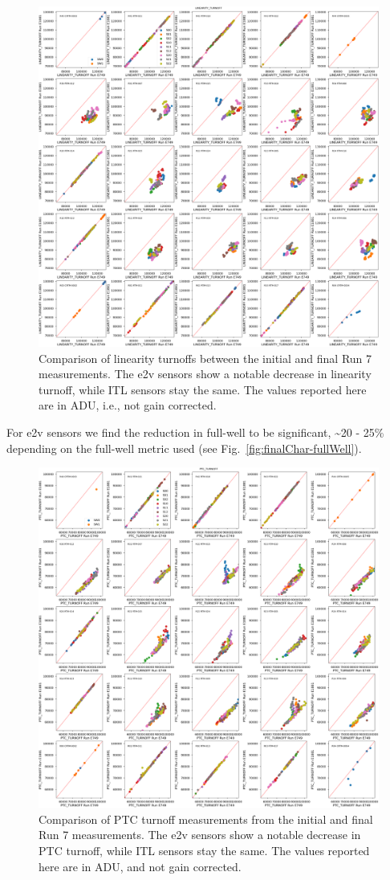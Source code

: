 \begin{figure}[ht]
    \centering
    \includegraphics[width=0.7\linewidth]{figures/finalCharacterization/E749_E1881_LINEARITY_TURNOFF.png}
    \caption{Comparison of linearity turnoffs between the initial and final Run 7 measurements. The e2v sensors show a notable decrease in linearity turnoff, while ITL sensors stay the same. The values reported here are in ADU, i.e., not gain corrected.}
    \label{fig:finalChar-Linearity-5x5}
\end{figure}

For e2v sensors we find the reduction in full-well to be significant, \textasciitilde20 - 25\% depending on the full-well metric used (see Fig.~\ref{fig:finalChar-fullWell}). 

\begin{figure}[ht]
    \centering
    \includegraphics[width=0.7\linewidth]{figures/finalCharacterization/E749_E1881_PTC_TURNOFF.png}
    \caption{Comparison of PTC turnoff measurements from the initial and final Run 7 measurements. The e2v sensors show a notable decrease in PTC turnoff, while ITL sensors stay the same. The values reported here are in ADU, and not gain corrected.}
    \label{fig:finalChar-PTCTurnoff-5x5}
\end{figure}


